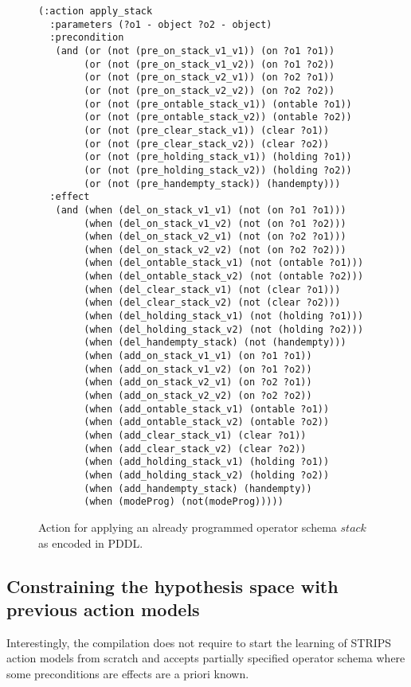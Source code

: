 \documentclass[letterpaper]{article} %
\begin{document}
\begin{figure}[hbt]
\begin{scriptsize}
\begin{verbatim}
(:action apply_stack
  :parameters (?o1 - object ?o2 - object)
  :precondition
   (and (or (not (pre_on_stack_v1_v1)) (on ?o1 ?o1))
        (or (not (pre_on_stack_v1_v2)) (on ?o1 ?o2))
        (or (not (pre_on_stack_v2_v1)) (on ?o2 ?o1))
        (or (not (pre_on_stack_v2_v2)) (on ?o2 ?o2))
        (or (not (pre_ontable_stack_v1)) (ontable ?o1))
        (or (not (pre_ontable_stack_v2)) (ontable ?o2))
        (or (not (pre_clear_stack_v1)) (clear ?o1))
        (or (not (pre_clear_stack_v2)) (clear ?o2))
        (or (not (pre_holding_stack_v1)) (holding ?o1))
        (or (not (pre_holding_stack_v2)) (holding ?o2))
        (or (not (pre_handempty_stack)) (handempty)))
  :effect
   (and (when (del_on_stack_v1_v1) (not (on ?o1 ?o1)))
        (when (del_on_stack_v1_v2) (not (on ?o1 ?o2)))
        (when (del_on_stack_v2_v1) (not (on ?o2 ?o1)))
        (when (del_on_stack_v2_v2) (not (on ?o2 ?o2)))
        (when (del_ontable_stack_v1) (not (ontable ?o1)))
        (when (del_ontable_stack_v2) (not (ontable ?o2)))
        (when (del_clear_stack_v1) (not (clear ?o1)))
        (when (del_clear_stack_v2) (not (clear ?o2)))
        (when (del_holding_stack_v1) (not (holding ?o1)))
        (when (del_holding_stack_v2) (not (holding ?o2)))
        (when (del_handempty_stack) (not (handempty)))
        (when (add_on_stack_v1_v1) (on ?o1 ?o1))
        (when (add_on_stack_v1_v2) (on ?o1 ?o2))
        (when (add_on_stack_v2_v1) (on ?o2 ?o1))
        (when (add_on_stack_v2_v2) (on ?o2 ?o2))
        (when (add_ontable_stack_v1) (ontable ?o1))
        (when (add_ontable_stack_v2) (ontable ?o2))
        (when (add_clear_stack_v1) (clear ?o1))
        (when (add_clear_stack_v2) (clear ?o2))
        (when (add_holding_stack_v1) (holding ?o1))
        (when (add_holding_stack_v2) (holding ?o2))
        (when (add_handempty_stack) (handempty))
        (when (modeProg) (not(modeProg)))))
\end{verbatim}
\end{scriptsize}
 \caption{\small Action for applying an already programmed operator schema $stack$ as encoded in PDDL.}
\label{fig:compilation}
\end{figure}


\subsection{Constraining the hypothesis space with previous action models}
Interestingly, the compilation does not require to start the learning of STRIPS action models from scratch and accepts partially specified operator schema where some preconditions are effects are a priori known.
\end{document}

